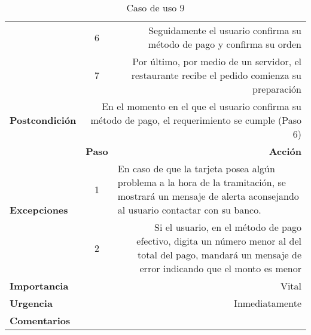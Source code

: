 \documentclass[conference]{IEEEtran}
\begin{document}
\begin{table}[H]
\begin{adjustbox}{width=0.45\textwidth}
\begin{tabular}{|p{11.215em}|r|r|}
\cmidrule{2-3}    \multicolumn{1}{|c|}{} & \multicolumn{1}{c|}{6} & \multicolumn{1}{p{32em}|}{Seguidamente el usuario confirma su método de pago y confirma su orden } \\
\cmidrule{2-3}    \multicolumn{1}{|c|}{} & \multicolumn{1}{c|}{7} & \multicolumn{1}{p{32em}|}{Por último, por medio de un servidor, el restaurante recibe el pedido comienza su preparación} \\
    \midrule
    \textbf{Postcondición} & \multicolumn{2}{p{37.355em}|}{En el momento en el que el usuario confirma su método de pago, el requerimiento se cumple (Paso 6)} \\
    \midrule
    \multirow{4}[6]{*}{\textbf{Excepciones}} & \multicolumn{1}{p{5.355em}|}{\textbf{Paso}} & \multicolumn{1}{p{32em}|}{\textbf{Acción}} \\
\cmidrule{2-3}    \multicolumn{1}{|c|}{} & \multicolumn{1}{c|}{\multirow{2}[2]{*}{1}} & \multicolumn{1}{l|}{\multirow{2}[2]{*}{En caso de que la tarjeta posea algún problema a la hora de la tramitación, se mostrará un mensaje de alerta aconsejando al usuario contactar con su banco. }} \\
    \multicolumn{1}{|c|}{} &       &  \\
\cmidrule{2-3}    \multicolumn{1}{|c|}{} & \multicolumn{1}{c|}{2} & \multicolumn{1}{p{32em}|}{Si el usuario, en el método de pago efectivo, digita un número menor al del total del pago, mandará un mensaje de error indicando que el monto es menor} \\
    \midrule
    \textbf{Importancia} & \multicolumn{2}{p{37.355em}|}{Vital} \\
    \midrule
    \textbf{Urgencia} & \multicolumn{2}{p{37.355em}|}{Inmediatamente} \\
    \midrule
    \textbf{Comentarios} & \multicolumn{2}{r|}{} \\
    \bottomrule
    \end{tabular}%
    \end{adjustbox}
    \vspace{0.2cm}
    \caption{Caso de uso 9}
  \label{tab:addlabel}%
\end{table}%
\end{document}
